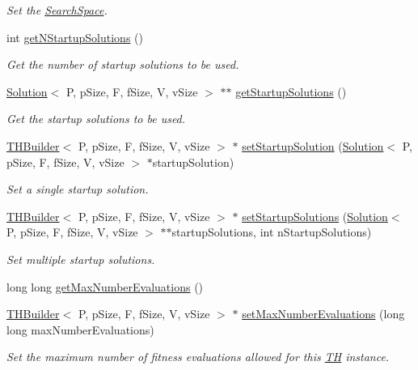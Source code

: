 \begin{DoxyCompactItemize}
\begin{DoxyCompactList}\small\item\em Set the \hyperlink{classSearchSpace}{Search\+Space}. \end{DoxyCompactList}\item 
int \hyperlink{classTHBuilder_a2635dd5906c5a0884eadd4357b57f622}{get\+N\+Startup\+Solutions} ()
\begin{DoxyCompactList}\small\item\em Get the number of startup solutions to be used. \end{DoxyCompactList}\item 
\hyperlink{classSolution}{Solution}$<$ P, p\+Size, F, f\+Size, V, v\+Size $>$ $\ast$$\ast$ \hyperlink{classTHBuilder_a4ee5b9c2c19c8e0adb0991593a4d19e5}{get\+Startup\+Solutions} ()
\begin{DoxyCompactList}\small\item\em Get the startup solutions to be used. \end{DoxyCompactList}\item 
\hyperlink{classTHBuilder}{T\+H\+Builder}$<$ P, p\+Size, F, f\+Size, V, v\+Size $>$ $\ast$ \hyperlink{classTHBuilder_a15fc2e240479724b68237c5beee89a17}{set\+Startup\+Solution} (\hyperlink{classSolution}{Solution}$<$ P, p\+Size, F, f\+Size, V, v\+Size $>$ $\ast$startup\+Solution)
\begin{DoxyCompactList}\small\item\em Set a single startup solution. \end{DoxyCompactList}\item 
\hyperlink{classTHBuilder}{T\+H\+Builder}$<$ P, p\+Size, F, f\+Size, V, v\+Size $>$ $\ast$ \hyperlink{classTHBuilder_a694516b770c24584f0473b4091af623e}{set\+Startup\+Solutions} (\hyperlink{classSolution}{Solution}$<$ P, p\+Size, F, f\+Size, V, v\+Size $>$ $\ast$$\ast$startup\+Solutions, int n\+Startup\+Solutions)
\begin{DoxyCompactList}\small\item\em Set multiple startup solutions. \end{DoxyCompactList}\item 
long long \hyperlink{classTHBuilder_a4b9fc144f6c5090f23514fff87a10f78}{get\+Max\+Number\+Evaluations} ()
\item 
\hyperlink{classTHBuilder}{T\+H\+Builder}$<$ P, p\+Size, F, f\+Size, V, v\+Size $>$ $\ast$ \hyperlink{classTHBuilder_a290771e2a41317ba51aa6df7d44f8f78}{set\+Max\+Number\+Evaluations} (long long max\+Number\+Evaluations)
\begin{DoxyCompactList}\small\item\em Set the maximum number of fitness evaluations allowed for this \hyperlink{classTH}{TH} instance. \end{DoxyCompactList}\item 

\end{DoxyCompactItemize}
